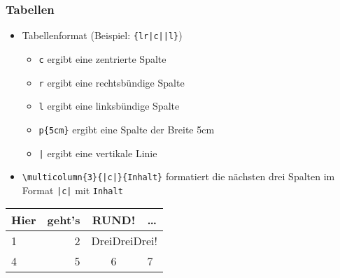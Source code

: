 \begin{frame}[fragile]
  \frametitle{Tabellen}


  \begin{itemize}
  \item<+-> Tabellenformat (Beispiel: \lstinline!{lr|c||l}!)
    \onslide<+->
    \begin{itemize}
    \item \lstinline|c| ergibt eine zentrierte Spalte
    \item \lstinline|r| ergibt eine rechtsbündige Spalte
    \item \lstinline|l| ergibt eine linksbündige Spalte
    \item \lstinline!p{5cm}! ergibt eine Spalte der Breite 5cm
    \item \lstinline!|! ergibt eine vertikale Linie
    \end{itemize}
  \item<+-> \lstinline!\multicolumn{3}{|c|}{Inhalt}! formatiert die nächsten drei Spalten
    im Format \lstinline!|c|! mit \lstinline!Inhalt!
  \end{itemize}

  \onslide<+->

  \medskip

  \begin{center}
    \begin{tabular}{|lr|c|p{2cm}|}
      Hier & geht's & RUND! & \dots \\
      \hline\hline
      1    &      2 & \multicolumn{2}{c}{ DreiDreiDrei! } \\
      4    &      5 & 6     & 7
    \end{tabular}
  \end{center}

\end{frame}

